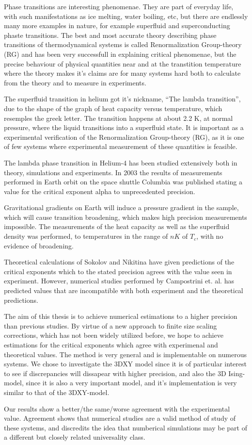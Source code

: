 %

Phase transitions are interesting phenomenae. They are part of everyday life, with such manifestations as ice melting, water boiling, etc, but there are endlessly many more examples in nature, for example superfluid and superconducting phaste transitions. The best and most accurate theory describing phase transitions of thermodynamical systems is called Renormalization Group-theory (RG) and has been very successfull in explaining critical phenomenae, but the precise behaviour of physical quantities near and at the transtition temperature where the theory makes it's claims are for many systems hard both to calculate from the theory and to measure in experiments.

The superfluid transition in helium got it's nickname, ``The lambda transition'', due to the shape of the graph of heat capacity versus temperature, which resemples the greek letter. The transition happens at about 2.2 K, at normal pressure, where the liquid transitions into a superfluid state. It is important as a experimental verification of the Renormalization Group-theory (RG), as it is one of few systems where experimental measurement of these quantities is feasible. 

The lambda phase transition in Helium-4 has been studied extensively both in theory, simulations and experiments. In 2003 the results of measurements performed in Earth orbit on the space shuttle Columbia was published\cite{Lipa2003} stating a value for the critical exponent alpha to unprecedented precision. 

Gravitational gradients on Earth will induce a pressure gradient in the sample, which will cause transition broadening, which makes high precision measurements impossible.
The measurements of the heat capacity as well as the superfluid density was performed, to temperatures in the range of $nK$ of $T_c$, with no evidence of broadening.

Theoretical calculations of Sokolov and Nikitina \cite{Sokolov2016} have given predictions of the critical exponents which to the stated precision agrees with the value seen in experiment.
However, numerical studies performed by Campostrini et. al. \cite{Campostrini2006} has predicted values that are incompatible with both experiment and the theoretical predictions. 

The aim of this thesis is to achieve numerical estimations to a higher precision than previous studies. By virtue of a new approach to finite size scaling corrections, which has not been widely utilized before, we hope to achieve estimations for the critical exponents which agree with experimenal and theoretical values. The method is very general and is implementable on numerous systems. We chose to investigate the 3DXY model since it is of  particular interest to see if discrepancies will dissapear with higher precision, and also the 3D Ising-model, since it is also a very important model, and it's implementation is very similar to that of the 3DXY-model.

Our results show a better/the same/worse agreement with the experimental value. Agreement shows that numerical studies are a valid method of study of these systems, and discredits the idea that numberical simulations may be part of a different but closely related universality class.


